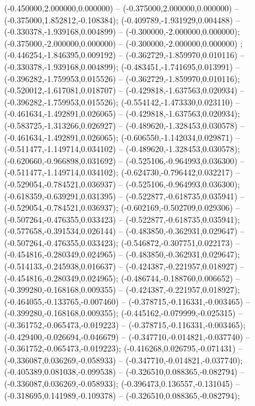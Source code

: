  (-0.450000,2.000000,0.000000) -- (-0.375000,2.000000,0.000000) -- (-0.375000,1.852812,-0.108384);
 (-0.409789,-1.931929,0.004488) -- (-0.330378,-1.939168,0.004899) -- (-0.300000,-2.000000,0.000000);
 (-0.375000,-2.000000,0.000000) -- (-0.300000,-2.000000,0.000000) ;
 (-0.446254,-1.846395,0.009192) -- (-0.362729,-1.859970,0.010116) -- (-0.330378,-1.939168,0.004899);
 (-0.483451,-1.741695,0.013991) -- (-0.396282,-1.759953,0.015526) -- (-0.362729,-1.859970,0.010116);
 (-0.520012,-1.617081,0.018707) -- (-0.429818,-1.637563,0.020934) -- (-0.396282,-1.759953,0.015526);
 (-0.554142,-1.473330,0.023110) -- (-0.461634,-1.492891,0.026065) -- (-0.429818,-1.637563,0.020934);
 (-0.583725,-1.313266,0.026927) -- (-0.489620,-1.328453,0.030578) -- (-0.461634,-1.492891,0.026065);
 (-0.606550,-1.142034,0.029871) -- (-0.511477,-1.149714,0.034102) -- (-0.489620,-1.328453,0.030578);
 (-0.620660,-0.966898,0.031692) -- (-0.525106,-0.964993,0.036300) -- (-0.511477,-1.149714,0.034102);
 (-0.624730,-0.796442,0.032217) -- (-0.529054,-0.784521,0.036937) -- (-0.525106,-0.964993,0.036300);
 (-0.618359,-0.639291,0.031395) -- (-0.522877,-0.618735,0.035941) -- (-0.529054,-0.784521,0.036937);
 (-0.602169,-0.502709,0.029306) -- (-0.507264,-0.476355,0.033423) -- (-0.522877,-0.618735,0.035941);
 (-0.577658,-0.391534,0.026144) -- (-0.483850,-0.362931,0.029647) -- (-0.507264,-0.476355,0.033423);
 (-0.546872,-0.307751,0.022173) -- (-0.454816,-0.280349,0.024965) -- (-0.483850,-0.362931,0.029647);
 (-0.514133,-0.245938,0.016637) -- (-0.424387,-0.221957,0.018927) -- (-0.454816,-0.280349,0.024965);
 (-0.486744,-0.188760,0.006652) -- (-0.399280,-0.168168,0.009355) -- (-0.424387,-0.221957,0.018927);
 (-0.464055,-0.133765,-0.007460) -- (-0.378715,-0.116331,-0.003465) -- (-0.399280,-0.168168,0.009355);
 (-0.445162,-0.079999,-0.025315) -- (-0.361752,-0.065473,-0.019223) -- (-0.378715,-0.116331,-0.003465);
 (-0.429400,-0.026694,-0.046679) -- (-0.347710,-0.014821,-0.037740) -- (-0.361752,-0.065473,-0.019223);
 (-0.416268,0.026795,-0.071431) -- (-0.336087,0.036269,-0.058933) -- (-0.347710,-0.014821,-0.037740);
 (-0.405389,0.081038,-0.099538) -- (-0.326510,0.088365,-0.082794) -- (-0.336087,0.036269,-0.058933);
 (-0.396473,0.136557,-0.131045) -- (-0.318695,0.141989,-0.109378) -- (-0.326510,0.088365,-0.082794);
